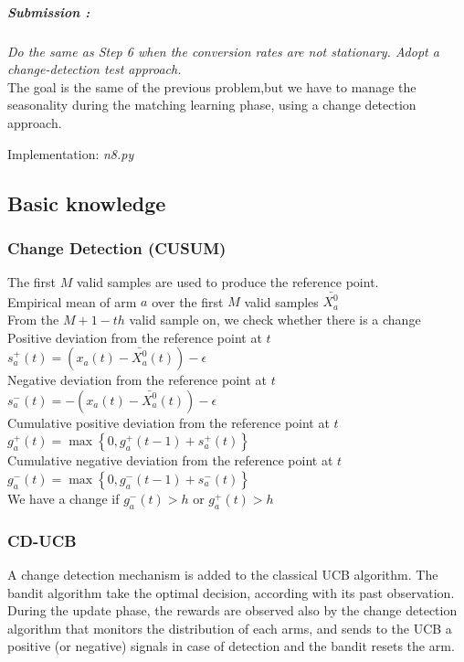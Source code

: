 \subparagraph*{Submission : }
\textit{Do the same as Step 6 when the conversion rates are not stationary. Adopt a change-detection test approach.}\\

The goal is the same of the previous problem,but we have to manage the seasonality during the matching learning phase, using a change detection approach.

Implementation: \textit{n8.py}
\subsection*{Basic knowledge}
\subsubsection*{Change Detection (CUSUM)}
The first $M$ valid samples are used to produce the reference point.\\

Empirical mean of arm $a$ over the first $M$ valid samples $\bar{X_{a}^0}$\\

From the $M + 1-th$ valid sample on, we check whether there is a change\\

Positive deviation from the reference point at $t$ \hspace{0.2cm} $s_{a}^{+}(t) = (x_{a}(t) - \bar{X_{a}^0}(t)) - \epsilon$ \\

Negative deviation from the reference point at $t$ \hspace{0.2cm} $s_{a}^{-}(t) = -  (x_{a}(t) - \bar{X_{a}^0}(t)) - \epsilon$ \\

Cumulative positive deviation from the reference point at $t$ \hspace{0.2cm} $g_{a}^{+}(t) = \max \left\{0, g_{a}^{+}(t-1) + s_{a}^{+}(t) \right\}$ \\

Cumulative negative deviation from the reference point at $t$ \hspace{0.2cm} $g_{a}^{-}(t) = \max \left\{0, g_{a}^{-}(t-1) + s_{a}^{-}(t) \right\}$ \\

We have a change if \hspace{0.2cm} $g_{a}^{-}(t) > h$ or $g_{a}^{+}(t) > h$\\
\subsubsection*{CD-UCB} 
A change detection mechanism is added to the classical UCB algorithm. The bandit algorithm take the optimal decision, according with its past observation. During the update phase, the rewards are observed also by the change detection algorithm that monitors the distribution of each arms, and sends to the UCB a positive (or negative) signals in case of detection and the bandit resets the arm.


